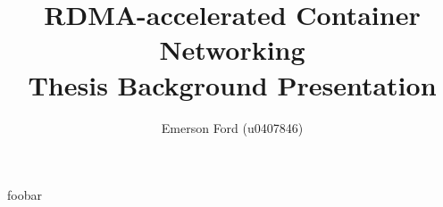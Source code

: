 \documentclass[12pt,notitlepage]{report}
\title{\Large\textbf{RDMA-accelerated Container Networking} \\
    \normalsize{}\vspace{10pt}
Thesis Background Presentation}
\author{Emerson Ford (u0407846)}
\date{}
\begin{document}
\maketitle
\doublespacing{}

foobar

\nocite{*}
\pagebreak
\printbibliography{}
\end{document}
